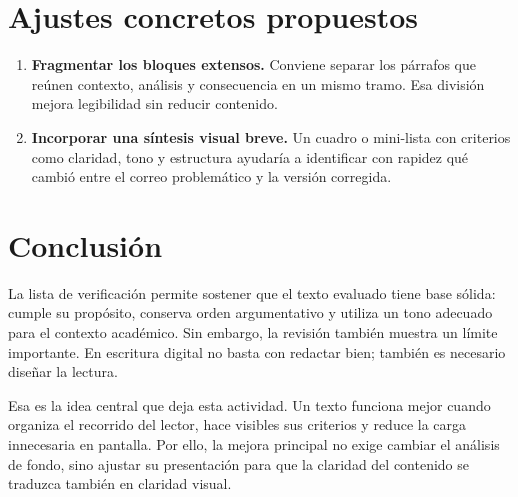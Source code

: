 \documentclass[
	spanish,
	letterpaper, oneside
]{article}
\begin{document}
\section{Ajustes concretos propuestos}

\begin{enumerate}
	\item \textbf{Fragmentar los bloques extensos.} Conviene separar los párrafos que reúnen contexto, análisis y consecuencia en un mismo tramo. Esa división mejora legibilidad sin reducir contenido.
	\item \textbf{Incorporar una síntesis visual breve.} Un cuadro o mini-lista con criterios como claridad, tono y estructura ayudaría a identificar con rapidez qué cambió entre el correo problemático y la versión corregida.
\end{enumerate}

\section{Conclusión}

La lista de verificación permite sostener que el texto evaluado tiene base sólida: cumple su propósito, conserva orden argumentativo y utiliza un tono adecuado para el contexto académico. Sin embargo, la revisión también muestra un límite importante. En escritura digital no basta con redactar bien; también es necesario diseñar la lectura.

Esa es la idea central que deja esta actividad. Un texto funciona mejor cuando organiza el recorrido del lector, hace visibles sus criterios y reduce la carga innecesaria en pantalla. Por ello, la mejora principal no exige cambiar el análisis de fondo, sino ajustar su presentación para que la claridad del contenido se traduzca también en claridad visual.


\end{document}
